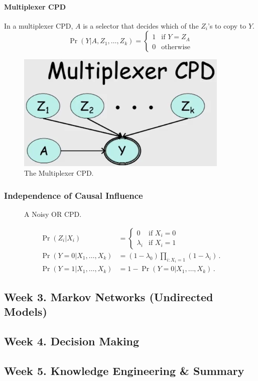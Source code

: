 \documentclass[12pt]{article}
\begin{document}
\paragraph{Multiplexer CPD}

In a multiplexer CPD, $A$ is a selector that decides which of the $Z_i$'s to copy to $Y$.
\begin{equation*}
  \Pr(Y | A, Z_1, \ldots, Z_k) = 
    \begin{cases}
    1 & \text{if } Y = Z_A \\
    0 & \text{otherwise}
    \end{cases}
\end{equation*}

\begin{figure}[H]
\centering
\includegraphics[width=4in]{graphics/multiplexer_cpd.png}
\caption{The Multiplexer CPD.}
\label{fig:multiplexer_cpd}
\end{figure}


\subsubsection{Independence of Causal Influence}

\begin{figure}[H]
\centering
\caption{A Noisy OR CPD.}
\label{fig:noisy_or_cpd}
\end{figure}

\begin{align*}
  \Pr(Z_i | X_i) & = 
    \begin{cases}
      0 & \text{if } X_i = 0 \\
      \lambda_i & \text{if } X_i = 1
    \end{cases} \\
  \Pr(Y=0 | X_1, \ldots, X_k) & = (1 - \lambda_0) \prod_{i: X_i = 1} (1 - \lambda_i) \, . \\
  \Pr(Y=1 | X_1, \ldots, X_k) & = 1 - \Pr(Y=0 | X_1, \ldots, X_k) \, .
\end{align*}

\subsection{Week 3. Markov Networks (Undirected Models)}


\subsection{Week 4. Decision Making}


\subsection{Week 5. Knowledge Engineering \& Summary}
\end{document}
